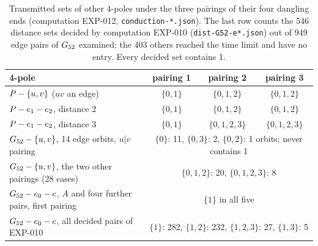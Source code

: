 \begin{table}[t]\centering\small
\begin{tabular}{p{5.4cm}ccc}
\toprule
4-pole & pairing 1 & pairing 2 & pairing 3 \\
\midrule
$P - \{u,v\}$ ($u v$ an edge) & $\{0,1\}$ & $\{0,1,2\}$ & $\{0,1,2\}$ \\
$P - e_1 - e_2$, distance 2 & $\{0,1\}$ & $\{0,1,2\}$ & $\{0,1,2\}$ \\
$P - e_1 - e_2$, distance 3 & $\{0,1\}$ & $\{0,1,2,3\}$ & $\{0,1,2,3\}$ \\
\midrule
$G_{52} - \{u,v\}$, 14 edge orbits, $u|v$ pairing & \multicolumn{3}{p{7.4cm}}{$\{0\}$: 11, $\{0,3\}$: 2, $\{0,2\}$: 1 orbits; never contains 1} \\
$G_{52} - \{u,v\}$, the two other pairings (28 cases) & \multicolumn{3}{p{7.4cm}}{$\{0,1,2\}$: 20, $\{0,1,2,3\}$: 8} \\
$G_{52} - e_0 - e$, $A$ and four further pairs, first pairing & \multicolumn{3}{p{7.4cm}}{$\{1\}$ in all five} \\
$G_{52} - e_0 - e$, all decided pairs of EXP-010 & \multicolumn{3}{p{7.4cm}}{$\{1\}$: 282, $\{1,2\}$: 232, $\{1,2,3\}$: 27, $\{1,3\}$: 5} \\
\bottomrule
\end{tabular}
\caption{Transmitted sets of other 4-poles under the three pairings of their four dangling ends (computation EXP-012, \texttt{conduction-*.json}). The last row counts the 546 distance sets decided by computation EXP-010 (\texttt{dist-G52-e*.json}) out of 949 edge pairs of $G_{52}$ examined; the 403 others reached the time limit and have no entry. Every decided set contains 1.}\label{tab:fourpoles}
\end{table}
